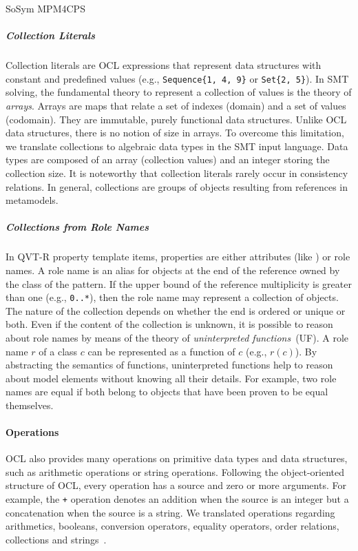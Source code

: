 \begin{copiedFrom}{SoSym MPM4CPS}
\subparagraph{Collection Literals}
Collection literals are OCL expressions that represent data structures with constant and predefined values (e.g., \lstinline|Sequence{1, 4, 9}| or \lstinline|Set{2, 5}|). In SMT solving, the fundamental theory to represent a collection of values is the theory of \textit{arrays}. Arrays are maps that relate a set of indexes (domain) and a set of values (codomain). They are immutable, purely functional data structures. Unlike OCL data structures, there is no notion of size in arrays. To overcome this limitation, we translate collections to algebraic data types in the SMT input language. Data types are composed of an array (collection values) and an integer storing the collection size. It is noteworthy that collection literals rarely occur in consistency relations. In general, collections are groups of objects resulting from references in metamodels.

\subparagraph{Collections from Role Names}
In QVT-R property template items, properties are either attributes (like ) or role names. A role name is an alias for objects at the end of the reference owned by the class of the pattern. If the upper bound of the reference multiplicity is greater than one (e.g., \texttt{0..*}), then the role name may represent a collection of objects. The nature of the collection depends on whether the end is ordered or unique or both. Even if the content of the collection is unknown, it is possible to reason about role names by means of the theory of \textit{uninterpreted functions}~(UF). A role name $r$ of a class $c$ can be represented as a function of $c$ (e.g., $r(c)$). By abstracting the semantics of functions, uninterpreted functions help to reason about model elements without knowing all their details. For example, two role names are equal if both belong to objects that have been proven to be equal themselves.

\paragraph{Operations}

OCL also provides many operations on primitive data types and data structures, such as arithmetic operations or string operations. Following the object-oriented structure of OCL, every operation has a source and zero or more arguments. For example, the \texttt{+} operation denotes an addition when the source is an integer but a concatenation when the source is a string.
We translated operations regarding arithmetics, booleans, conversion operators, equality operators, order relations, collections and strings~\cite{pepin2019ma}.


\end{copiedFrom}
